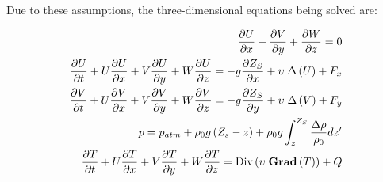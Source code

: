 Due to these assumptions, the three-dimensional equations being solved are:

\begin{subequations}
\label{eq:equa1}
\begin{align}
\frac{\partial U}{\partial x} +\frac{\partial V}{\partial y} +\frac{\partial
W}{\partial z} =0
\\
\frac{\partial U}{\partial t} +U\frac{\partial
U}{\partial x} +V\frac{\partial U}{\partial y} +W\frac{\partial U}{\partial z}
=-g\frac{\partial Z_{S} }{\partial x} +\upsilon \; \Delta \left(U\right)+F_{x}
\\
\frac{\partial V}{\partial t} +U\frac{\partial V}{\partial
x} +V\frac{\partial V}{\partial y} +W\frac{\partial V}{\partial z}
=-g\frac{\partial Z_{S} }{\partial y} +\upsilon \; \Delta \left(V\right)+F_{y}
\\
p=p_{atm} +\rho _{0} g\left(Z_{s} -z\right)+\rho _{0} g\int _{z}^{Z_{S}
}\frac{\Delta \rho }{\rho _{0} } dz'
\\
\frac{\partial T}{\partial t}
+U\frac{\partial T}{\partial x} +V\frac{\partial T}{\partial y}
+W\frac{\partial T}{\partial z} =
\text{Div} \left( \upsilon \; \text{\bfseries{Grad}} \left(T\right)\right) + Q
\end{align}
\end{subequations}

